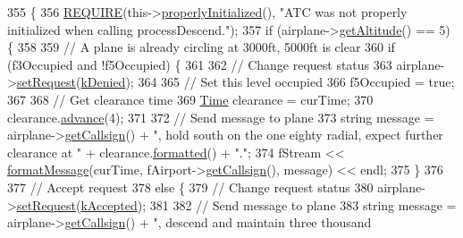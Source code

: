 \begin{DoxyCode}
355                                                          \{
356     \hyperlink{DesignByContract_8h_aeb774672b46dbe80afc14e0d1970f017}{REQUIRE}(this->\hyperlink{classATC_a6b6a10a87c06028bd96d6e5efff170b7}{properlyInitialized}(), \textcolor{stringliteral}{"ATC was not properly initialized when
       calling processDescend."});
357     \textcolor{keywordflow}{if} (airplane->\hyperlink{classAirplane_ad2550909ab563f7df850f79f23c3a308}{getAltitude}() == 5) \{
358 
359         \textcolor{comment}{// A plane is already circling at 3000ft, 5000ft is clear}
360         \textcolor{keywordflow}{if} (f3Occupied and !f5Occupied) \{
361 
362             \textcolor{comment}{// Change request status}
363             airplane->\hyperlink{classAirplane_affcc5325670824881ccc1524223aa209}{setRequest}(\hyperlink{Airplane_8h_a4a8a3f45932bdf601f093bea061bad9baac195c08fab2dff9d0520caf49ea4e11}{kDenied});
364 
365             \textcolor{comment}{// Set this level occupied}
366             f5Occupied = \textcolor{keyword}{true};
367 
368             \textcolor{comment}{// Get clearance time}
369             \hyperlink{classTime}{Time} clearance = curTime;
370             clearance.\hyperlink{classTime_a41c94422f10c95daab849b9c20afdeba}{advance}(4);
371 
372             \textcolor{comment}{// Send message to plane}
373             \textcolor{keywordtype}{string} message = airplane->\hyperlink{classAirplane_a6a62bd06d28789336c5ce1543d9391f1}{getCallsign}() + \textcolor{stringliteral}{", hold south on the one eighty radial,
       expect further clearance at "} + clearance.\hyperlink{classTime_aeeb2d2b5a624d0d78b7f5d146d0682f5}{formatted}() + \textcolor{stringliteral}{"."};
374             fStream << \hyperlink{classATC_a2fca67fc154c7d8a6c14198697653059}{formatMessage}(curTime, fAirport->\hyperlink{classAirport_a6ed56e05a8c881b8e4718a34ba9cccc5}{getCallsign}(), message) << 
      endl;
375         \}
376 
377         \textcolor{comment}{// Accept request}
378         \textcolor{keywordflow}{else} \{
379             \textcolor{comment}{// Change request status}
380             airplane->\hyperlink{classAirplane_affcc5325670824881ccc1524223aa209}{setRequest}(\hyperlink{Airplane_8h_a4a8a3f45932bdf601f093bea061bad9ba15597ea7f444a937d40b39b9ea99dd1d}{kAccepted});
381 
382             \textcolor{comment}{// Send message to plane}
383             \textcolor{keywordtype}{string} message = airplane->\hyperlink{classAirplane_a6a62bd06d28789336c5ce1543d9391f1}{getCallsign}() + \textcolor{stringliteral}{", descend and maintain three thousand
}
\end{DoxyCode}
